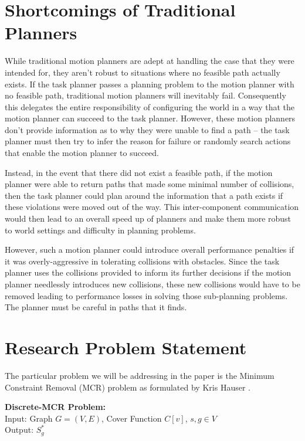 \section{Shortcomings of Traditional Planners} \label{intro:shortcomings}
While traditional motion planners are adept at handling the case that they were intended for, they aren't robust to situations where no feasible path actually exists. If the task planner passes a planning problem to the motion planner with no feasible path, traditional motion planners will inevitably fail. Consequently this delegates the entire responsibility of configuring the world in a way that the motion planner can succeed to the task planner. However, these motion planners don't provide information as to why they were unable to find a path -- the task planner must then try to infer the reason for failure or randomly search actions that enable the motion planner to succeed.

Instead, in the event that there did not exist a feasible path, if the motion planner were able to return paths that made some minimal number of collisions, then the task planner could plan around the information that a path exists if these violations were moved out of the way. This inter-component communication would then lead to an overall speed up of planners and make them more robust to world settings and difficulty in planning problems.

However, such a motion planner could introduce overall performance penalties if it was overly-aggressive in tolerating collisions with obstacles. Since the task planner uses the collisions provided to inform its further decisions if the motion planner needlessly introduces new collisions, these new collisions would have to be removed leading to performance losses in solving those sub-planning problems. The planner must be careful in paths that it finds.

\section{Research Problem Statement} \label{intro:statement}
The particular problem we will be addressing in the paper is the Minimum Constraint Removal (MCR) problem as formulated by Kris Hauser .

\noindent
{\bf{Discrete-MCR Problem:}}\\
Input: Graph $G = (V,E)$, Cover Function $C[v]$, $s,g \in V$  \\
Output: $S^{*}_g$
\newline


